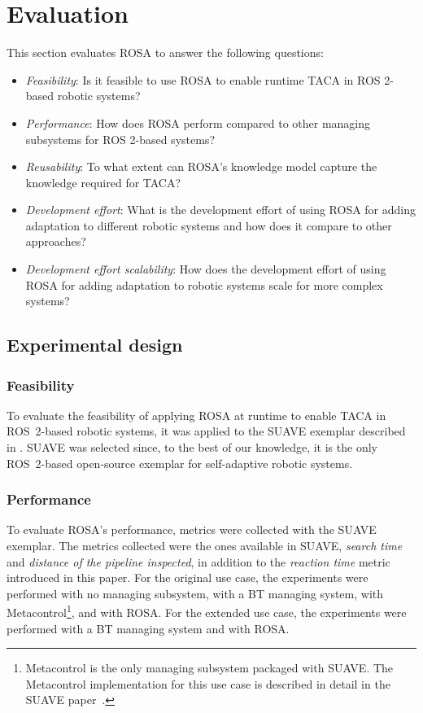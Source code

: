 \section{Evaluation}\label{sec:rosa:evaluation}

This section evaluates ROSA to answer the following questions:
\begin{itemize}
    \item \emph{Feasibility}: Is it feasible to use ROSA to enable runtime TACA in ROS 2-based robotic systems?
    \item \emph{Performance}: How does ROSA perform compared to other managing subsystems for ROS 2-based systems?
    \item \emph{Reusability}:  To what extent can ROSA's knowledge model capture the knowledge required for TACA\@?
    \item \emph{Development effort}: What is the development effort of using ROSA for adding adaptation to different robotic systems and how does it compare to other approaches?
    \item \emph{Development effort scalability}: How does the development effort of using ROSA for adding adaptation to robotic systems scale for more complex systems?
\end{itemize}

\subsection{Experimental design}

\subsubsection{Feasibility} To evaluate the feasibility of applying ROSA at runtime to enable TACA in ROS~2-based robotic systems, it was applied to the SUAVE exemplar described in . SUAVE was selected since, to the best of our knowledge, it is the only ROS~2-based open-source exemplar for self-adaptive robotic systems.

\subsubsection{Performance}
To evaluate ROSA's performance, metrics were collected
with the SUAVE exemplar.
The metrics collected were the ones available in SUAVE, \emph{search time} and \emph{distance of the pipeline inspected}, in addition to the \emph{reaction time} metric introduced in this paper. For the original use case, the experiments were performed with no managing subsystem, with a BT managing system, with Metacontrol\footnote{Metacontrol is the only managing subsystem packaged with SUAVE\@. The Metacontrol implementation for this use case is described in detail in the SUAVE paper~\citep{suave}.}, and with ROSA\@. For the extended use case, the experiments were performed with a BT managing system and with ROSA\@.


